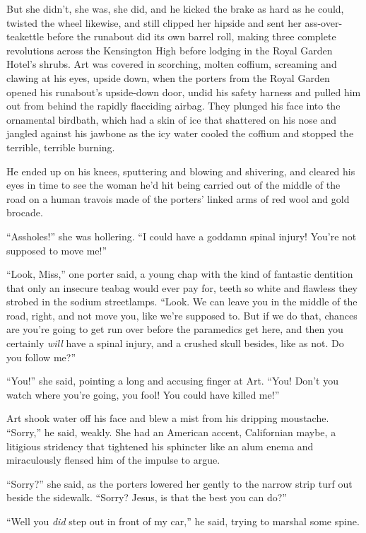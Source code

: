 But she didn’t, she was, she did, and he kicked the brake as hard
as he could, twisted the wheel likewise, and still clipped her
hipside and sent her ass-over-teakettle before the runabout did its
own barrel roll, making three complete revolutions across the
Kensington High before lodging in the Royal Garden Hotel’s shrubs.
Art was covered in scorching, molten coffium, screaming and clawing
at his eyes, upside down, when the porters from the Royal Garden
opened his runabout’s upside-down door, undid his safety harness
and pulled him out from behind the rapidly flacciding airbag. They
plunged his face into the ornamental birdbath, which had a skin of
ice that shattered on his nose and jangled against his jawbone as
the icy water cooled the coffium and stopped the terrible, terrible
burning.

He ended up on his knees, sputtering and blowing and shivering, and
cleared his eyes in time to see the woman he’d hit being carried
out of the middle of the road on a human travois made of the
porters’ linked arms of red wool and gold brocade.

“Assholes!” she was hollering. “I could have a goddamn spinal
injury! You’re not supposed to move me!”

“Look, Miss,” one porter said, a young chap with the kind of
fantastic dentition that only an insecure teabag would ever pay
for, teeth so white and flawless they strobed in the sodium
streetlamps. “Look. We can leave you in the middle of the road,
right, and not move you, like we’re supposed to. But if we do that,
chances are you’re going to get run over before the paramedics get
here, and then you certainly \emph{will} have a spinal injury, and
a crushed skull besides, like as not. Do you follow me?”

“You!” she said, pointing a long and accusing finger at Art. “You!
Don’t you watch where you’re going, you fool! You could have killed
me!”

Art shook water off his face and blew a mist from his dripping
moustache. “Sorry,” he said, weakly. She had an American accent,
Californian maybe, a litigious stridency that tightened his
sphincter like an alum enema and miraculously flensed him of the
impulse to argue.

“Sorry?” she said, as the porters lowered her gently to the narrow
strip turf out beside the sidewalk. “Sorry? Jesus, is that the best
you can do?”

“Well you \emph{did} step out in front of my car,” he said, trying
to marshal some spine.

